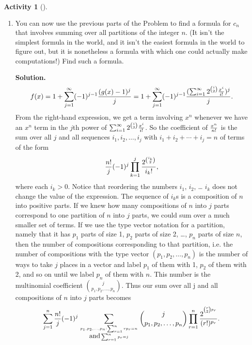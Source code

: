\documentclass[10pt,]{book}
\theoremstyle{plain}
\theoremstyle{definition}
\newtheorem{activity}[project]{Activity}
\numberwithin{equation}{chapter}
\begin{document}
\begin{activity}[]
\begin{enumerate}[label=(\alph*)]
~\par
\item You can now use the previous parts of the Problem to find a formula for \(c_n\) that involves summing over all partitions of the integer \(n\). (It isn't the simplest formula in the world, and it isn't the easiest formula in the world to figure out, but it is nonetheless a formula with which one could actually make computations!)  Find such a  formula.%
\par\medskip\noindent%
\textbf{Solution.}\quad %
\begin{equation*}
f(x) = 1+\sum_{j=1}^\infty
(-1)^{j-1}{(g(x)-1)^j\over j}= 1+\sum_{j=1}^\infty
(-1)^{j-1}{(\sum_{i=1}^\infty 2^{i\choose 2}{x^i\over i!})^j\over j}.
\end{equation*}
From the right-hand expression, we get a term involving \(x^n\) whenever we have an \(x^n\) term in the \(j\)th power of \(\sum_{i=1}^\infty 2^{i\choose
2}{x^i\over i!}\). So the coefficient of \(x^n\over n!\) is the sum over all \(j\) and all sequences \(i_1,i_2,\ldots,i_j\) with \(i_1+i_2+\cdots+i_j = n\) of terms of the form%
\begin{equation*}
{n!\over
j}(-1)^j\prod_{k=1}^j {2^{i_k\choose 2}
\over i_k!},
\end{equation*}
where each \(i_k>0\). Notice that reordering the numbers \(i_1\), \(i_2\), \dots{} \(i_k\) does not change the value of the expression. The sequence of \(i_k\)s is a composition of \(n\) into positive parts. If we knew how many compositions of \(n\) into \(j\) parts correspond to one partition of \(n\) into \(j\) parts, we could sum over a much smaller set of terms. If we use the type vector notation for a partition, namely that it has \(p_1\) parts of size 1, \(p_2\) parts of size 2, \dots{}, \(p_n\) parts of size \(n\), then the number of compositions corresponding to that partition, i.e. the number of compositions with the type vector \((p_1,p_2, \ldots, p_n)\) is the number of ways to take \(j\) places in a vector and label \(p_1\) of them with 1, \(p_2\) of them with 2, and so on until we label \(p_n\) of them with \(n\). This number is the multinomial coefficient \(j\choose p_1,p_2,\ldots, p_n\). Thus our sum over all j and all compositions of \(n\) into \(j\) parts becomes%
\begin{equation*}
\sum_{j=1}^n {n!\over j}(-1)^j\sum_{{p_1,p_2,\ldots,p_n: \sum_{r=1}^n
rp_r =n \atop \mbox{and}  \sum_{r=1}^n p_r =j}}{j\choose p_1, p_2, \ldots,
p_n}
\prod_{r=1}^n{2^{^{{r\choose 2}p_r}}
\over (r!)^{p_r}}.
\end{equation*}

\end{enumerate}
\end{activity}
\end{document}
